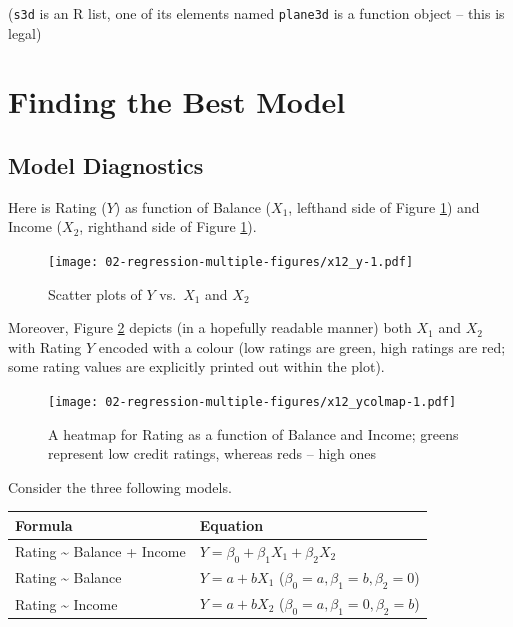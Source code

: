 \documentclass[10pt,b5paper,krantz1]{krantz}
\begin{document}
(\texttt{s3d} is an R list, one of its elements named \texttt{plane3d} is a function object -- this is legal)

\hypertarget{finding-the-best-model}{%
\section{Finding the Best Model}\label{finding-the-best-model}}

\hypertarget{model-diagnostics}{%
\subsection{Model Diagnostics}\label{model-diagnostics}}

Here is Rating (\(Y\)) as function of Balance (\(X_1\), lefthand side of Figure \ref{fig:x12_y})
and Income (\(X_2\), righthand side of Figure \ref{fig:x12_y}).

\begin{figure}
\hypertarget{fig:x12_y}{%
\centering
\texttt{[image: 02-regression-multiple-figures/x12\_y-1.pdf]}
\caption{Scatter plots of \(Y\) vs.~\(X_1\) and \(X_2\)}\label{fig:x12_y}
}
\end{figure}

Moreover, Figure \ref{fig:x12_ycolmap} depicts
(in a hopefully readable manner) both \(X_1\) and \(X_2\) with Rating \(Y\)
encoded with a colour (low ratings are green, high ratings are red;
some rating values are explicitly printed out within the plot).

\begin{figure}
\hypertarget{fig:x12_ycolmap}{%
\centering
\texttt{[image: 02-regression-multiple-figures/x12\_ycolmap-1.pdf]}
\caption{A heatmap for Rating as a function of Balance and Income; greens represent low credit ratings, whereas reds -- high ones}\label{fig:x12_ycolmap}
}
\end{figure}

Consider the three following models.

\begin{longtable}[]{@{}ll@{}}
\toprule
Formula & Equation\tabularnewline
\midrule
\endhead
Rating \textasciitilde{} Balance + Income & \(Y=\beta_0 + \beta_1 X_1 + \beta_2 X_2\)\tabularnewline
Rating \textasciitilde{} Balance & \(Y=a + b X_1\) (\(\beta_0=a, \beta_1=b, \beta_2=0\))\tabularnewline
Rating \textasciitilde{} Income & \(Y=a + b X_2\) (\(\beta_0=a, \beta_1=0, \beta_2=b\))\tabularnewline
\bottomrule
\end{longtable}
\end{document}
